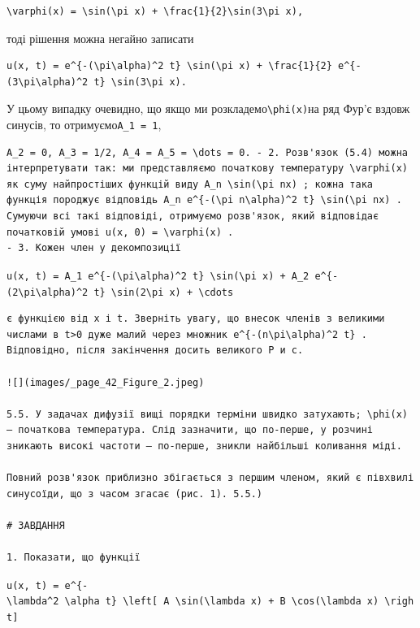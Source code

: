 \documentclass[
  ukrainian,
]{article}
\begin{document}
\begin{verbatim}
\varphi(x) = \sin(\pi x) + \frac{1}{2}\sin(3\pi x),
\end{verbatim}

тоді рішення можна негайно записати

\begin{verbatim}
u(x, t) = e^{-(\pi\alpha)^2 t} \sin(\pi x) + \frac{1}{2} e^{-(3\pi\alpha)^2 t} \sin(3\pi x).
\end{verbatim}

У цьому випадку очевидно, що якщо ми
розкладемо\texttt{\textbackslash{}phi(x)}на ряд Фур'є вздовж синусів, то
отримуємо\texttt{A\_1\ =\ 1},

\begin{verbatim}
A_2 = 0, A_3 = 1/2, A_4 = A_5 = \dots = 0. - 2. Розв'язок (5.4) можна інтерпретувати так: ми представляємо початкову температуру \varphi(x) як суму найпростіших функцій виду A_n \sin(\pi nx) ; кожна така функція породжує відповідь A_n e^{-(\pi n\alpha)^2 t} \sin(\pi nx) . Сумуючи всі такі відповіді, отримуємо розв'язок, який відповідає початковій умові u(x, 0) = \varphi(x) .
- 3. Кожен член у декомпозиції
\end{verbatim}

\texttt{u(x,\ t)\ =\ A\_1\ e\^{}\{-(\textbackslash{}pi\textbackslash{}alpha)\^{}2\ t\}\ \textbackslash{}sin(\textbackslash{}pi\ x)\ +\ A\_2\ e\^{}\{-(2\textbackslash{}pi\textbackslash{}alpha)\^{}2\ t\}\ \textbackslash{}sin(2\textbackslash{}pi\ x)\ +\ \textbackslash{}cdots}

\begin{verbatim}
є функцією від x і t. Зверніть увагу, що внесок членів з великими числами в t>0 дуже малий через множник e^{-(n\pi\alpha)^2 t} . Відповідно, після закінчення досить великого Р и с.

![](images/_page_42_Figure_2.jpeg)

5.5. У задачах дифузії вищі порядки терміни швидко затухають; \phi(x) — початкова температура. Слід зазначити, що по-перше, у розчині зникають високі частоти — по-перше, зникли найбільші коливання міді.

Повний розв'язок приблизно збігається з першим членом, який є півхвилі синусоїди, що з часом згасає (рис. 1). 5.5.)

# ЗАВДАННЯ

1. Показати, що функції
\end{verbatim}

\texttt{u(x,\ t)\ =\ e\^{}\{-\textbackslash{}lambda\^{}2\ \textbackslash{}alpha\textquotesingle{}\ t\}\ \textbackslash{}left{[}\ A\ \textbackslash{}sin(\textbackslash{}lambda\ x)\ +\ B\ \textbackslash{}cos(\textbackslash{}lambda\ x)\ \textbackslash{}right{]}}
\end{document}
